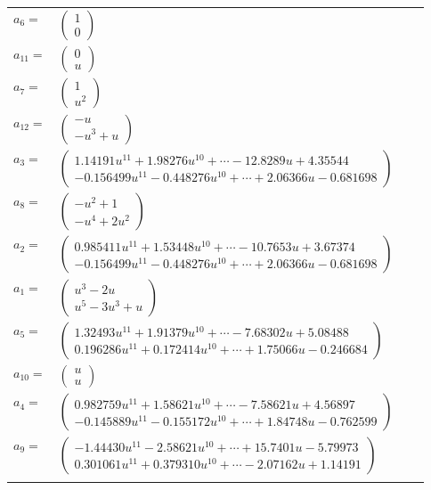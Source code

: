 \documentclass[1p]{elsarticle_modified}
\theoremstyle{definition}
\begin{document}
\begin{tabular}{m{7pt} m{180pt} m{7pt} m{180pt} }
\flushright $a_{6}=$&$\begin{pmatrix}1\\0\end{pmatrix}$ \\
\flushright $a_{11}=$&$\begin{pmatrix}0\\u\end{pmatrix}$ \\
\flushright $a_{7}=$&$\begin{pmatrix}1\\u^2\end{pmatrix}$ \\
\flushright $a_{12}=$&$\begin{pmatrix}- u\\- u^3+u\end{pmatrix}$ \\
\flushright $a_{3}=$&$\begin{pmatrix}1.14191 u^{11}+1.98276 u^{10}+\cdots-12.8289 u+4.35544\\-0.156499 u^{11}-0.448276 u^{10}+\cdots+2.06366 u-0.681698\end{pmatrix}$ \\
\flushright $a_{8}=$&$\begin{pmatrix}- u^2+1\\- u^4+2 u^2\end{pmatrix}$ \\
\flushright $a_{2}=$&$\begin{pmatrix}0.985411 u^{11}+1.53448 u^{10}+\cdots-10.7653 u+3.67374\\-0.156499 u^{11}-0.448276 u^{10}+\cdots+2.06366 u-0.681698\end{pmatrix}$ \\
\flushright $a_{1}=$&$\begin{pmatrix}u^3-2 u\\u^5-3 u^3+u\end{pmatrix}$ \\
\flushright $a_{5}=$&$\begin{pmatrix}1.32493 u^{11}+1.91379 u^{10}+\cdots-7.68302 u+5.08488\\0.196286 u^{11}+0.172414 u^{10}+\cdots+1.75066 u-0.246684\end{pmatrix}$ \\
\flushright $a_{10}=$&$\begin{pmatrix}u\\u\end{pmatrix}$ \\
\flushright $a_{4}=$&$\begin{pmatrix}0.982759 u^{11}+1.58621 u^{10}+\cdots-7.58621 u+4.56897\\-0.145889 u^{11}-0.155172 u^{10}+\cdots+1.84748 u-0.762599\end{pmatrix}$ \\
\flushright $a_{9}=$&$\begin{pmatrix}-1.44430 u^{11}-2.58621 u^{10}+\cdots+15.7401 u-5.79973\\0.301061 u^{11}+0.379310 u^{10}+\cdots-2.07162 u+1.14191\end{pmatrix}$\\&\end{tabular}
\end{document}

